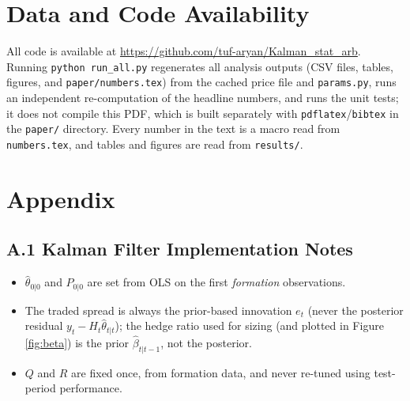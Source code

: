 \documentclass[11pt,a4paper]{article}
\begin{document}
\section*{Data and Code Availability}
All code is available at \url{https://github.com/tuf-aryan/Kalman_stat_arb}. Running \texttt{python run\_all.py} regenerates all analysis outputs (CSV files, tables, figures, and \texttt{paper/numbers.tex}) from the cached price file and \texttt{params.py}, runs an independent re-computation of the headline numbers, and runs the unit tests; it does not compile this PDF, which is built separately with \texttt{pdflatex}/\texttt{bibtex} in the \texttt{paper/} directory. Every number in the text is a macro read from \texttt{numbers.tex}, and tables and figures are read from \texttt{results/}.




\appendix
\section*{Appendix}

\subsection*{A.1 Kalman Filter Implementation Notes}
\begin{itemize}[nosep]
  \item $\hat\theta_{0|0}$ and $P_{0|0}$ are set from OLS on the first \KalmanBurnin{} \emph{formation} observations.
  \item The traded spread is always the prior-based innovation $e_t$ (never the posterior residual $y_t - H_t\hat\theta_{t|t}$); the hedge ratio used for sizing (and plotted in Figure \ref{fig:beta}) is the prior $\hat\beta_{t|t-1}$, not the posterior.
  \item $Q$ and $R$ are fixed once, from formation data, and never re-tuned using test-period performance.
\end{itemize}
\end{document}
